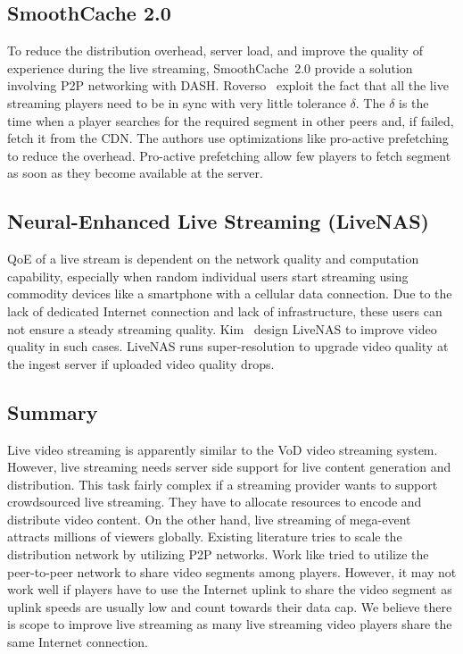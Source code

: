 \subsection{SmoothCache 2.0}
To reduce the distribution overhead, server load, and improve the quality of experience during the live streaming, SmoothCache~2.0\cite{10.1145/2713168.2713182} provide a solution involving P2P networking with DASH. Roverso \etal\ exploit the fact that all the live streaming players need to be in sync with very little tolerance $\delta$. The $\delta$ is the time when a player searches for the required segment in other peers and, if failed, fetch it from the CDN. The authors use optimizations like pro-active prefetching to reduce the overhead. Pro-active prefetching allow few players to fetch segment as soon as they become available at the server.

\subsection{Neural-Enhanced Live Streaming (LiveNAS)}
QoE of a live stream is dependent on the network quality and computation capability, especially when random individual users start streaming using commodity devices like a smartphone with a cellular data connection. Due to the lack of dedicated Internet connection and lack of infrastructure, these users can not ensure a steady streaming quality. Kim \etal\ design LiveNAS\cite{10.1145/3387514.3405856} to improve video quality in such cases. LiveNAS runs super-resolution to upgrade video quality at the ingest server if uploaded video quality drops.

\subsection{Summary}
Live video streaming is apparently similar to the VoD video streaming system. However, live streaming needs server side support for live content generation and distribution. This task fairly complex if a streaming provider wants to support crowdsourced live streaming. They have to allocate resources to encode and distribute video content. On the other hand, live streaming of mega-event attracts millions of viewers globally. Existing literature tries to scale the distribution network by utilizing P2P networks. Work like \cite{10.1145/2713168.2713182} tried to utilize the peer-to-peer network to share video segments among players. However, it may not work well if players have to use the Internet uplink to share the video segment as uplink speeds are usually low and count towards their data cap. We believe there is scope to improve live streaming as many live streaming video players share the same Internet connection.